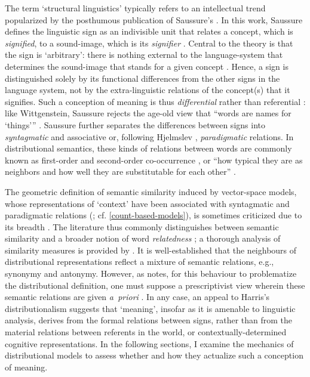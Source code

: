 The term `structural linguistics' typically refers to an intellectual trend popularized
by the posthumous publication of Saussure's 
\parencites[3-4,6]{Matthews2001}.
In this work, Saussure defines the linguistic sign as an indivisible unit that relates
a concept, which is \emph{signified}, to a sound-image, which is its \emph{signifier}
\parencites*[65-67]{Saussure2011}.
Central to the theory is that the sign is `arbitrary': there is nothing external to the
language-system that determines the sound-image that stands for a given concept
\parencites*[67-70]{Saussure2011}.
Hence, a sign is distinguished solely by its functional differences from the other
signs in the language system, not by the extra-linguistic relations of the concept(s)
that it signifies.
Such a conception of meaning is thus \emph{differential} rather than referential
\parencites[5]{Sahlgren2008}: like Wittgenstein, Saussure rejects the age-old view that
``words are names for `things''' \parencites[18]{Matthews2001}[11]{Lenci2023}.
Saussure further separates the differences between signs into \emph{syntagmatic} and
associative or, following Hjelmslev \parencite*{Hjelmslev1938}, \emph{paradigmatic}
relations.
In distributional semantics, these kinds of relations between words are commonly known
as first-order and second-order co-occurrence \parencites[126]{Jurafsky2023}, or ``how
typical they are as neighbors and how well they are substitutable for each other''
\parencites[1;~cf.~\cref{contextual-language-models}]{Schutze1993}.

The geometric definition of semantic similarity induced by vector-space models, whose
representations of `context' have been associated with syntagmatic and paradigmatic
relations (\cite{Sahlgren2008}; cf. \cref{count-based-models}), is sometimes criticized
due to its breadth \parencites[2]{Pado2003}.
The literature thus commonly distinguishes between semantic similarity and a broader
notion of word \emph{relatedness} \parencites{Budanitsky2006}[105-106]{Jurafsky2023}; a
thorough analysis of similarity measures is provided by \textcites{Curran2004}.
It is well-established that the neighbours of distributional representations reflect a
mixture of semantic relations, e.g., synonymy and antonymy.
However, as \textcites[4]{Sahlgren2008} notes, for this behaviour to problematize the
distributional definition, one must suppose a prescriptivist view wherein these
semantic relations are given \emph{a~priori} \parencite[188]{Gastaldi2021}.
In any case, an appeal to Harris's distributionalism suggests that `meaning', insofar
as it is amenable to linguistic analysis, derives from the formal relations between
signs, rather than from the material relations between referents in the world, or
contextually-determined cognitive representations.
In the following sections, I examine the mechanics of distributional models to assess
whether and how they actualize such a conception of meaning.
